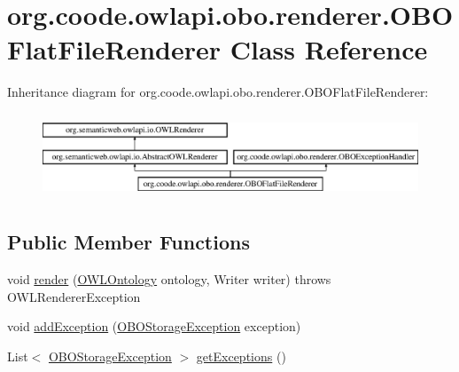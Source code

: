 \hypertarget{classorg_1_1coode_1_1owlapi_1_1obo_1_1renderer_1_1_o_b_o_flat_file_renderer}{\section{org.\-coode.\-owlapi.\-obo.\-renderer.\-O\-B\-O\-Flat\-File\-Renderer Class Reference}
\label{classorg_1_1coode_1_1owlapi_1_1obo_1_1renderer_1_1_o_b_o_flat_file_renderer}
}
Inheritance diagram for org.\-coode.\-owlapi.\-obo.\-renderer.\-O\-B\-O\-Flat\-File\-Renderer\-:\begin{figure}[H]
\begin{center}
\leavevmode
\includegraphics[height=2.553191cm]{classorg_1_1coode_1_1owlapi_1_1obo_1_1renderer_1_1_o_b_o_flat_file_renderer}
\end{center}
\end{figure}
\subsection*{Public Member Functions}
\begin{DoxyCompactItemize}
\item 
void \hyperlink{classorg_1_1coode_1_1owlapi_1_1obo_1_1renderer_1_1_o_b_o_flat_file_renderer_aa32b0372799155c844c24cdd31172dbb}{render} (\hyperlink{interfaceorg_1_1semanticweb_1_1owlapi_1_1model_1_1_o_w_l_ontology}{O\-W\-L\-Ontology} ontology, Writer writer)  throws O\-W\-L\-Renderer\-Exception 
\item 
void \hyperlink{classorg_1_1coode_1_1owlapi_1_1obo_1_1renderer_1_1_o_b_o_flat_file_renderer_ab0cd05a065b40d44d35b9d8889d73cb8}{add\-Exception} (\hyperlink{classorg_1_1coode_1_1owlapi_1_1obo_1_1renderer_1_1_o_b_o_storage_exception}{O\-B\-O\-Storage\-Exception} exception)
\item 
List$<$ \hyperlink{classorg_1_1coode_1_1owlapi_1_1obo_1_1renderer_1_1_o_b_o_storage_exception}{O\-B\-O\-Storage\-Exception} $>$ \hyperlink{classorg_1_1coode_1_1owlapi_1_1obo_1_1renderer_1_1_o_b_o_flat_file_renderer_ab370a327c93ce74a98e1a243cef82e84}{get\-Exceptions} ()
\end{DoxyCompactItemize}
